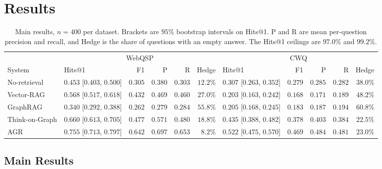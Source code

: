%
\section{Results}\label{sec:results}

\begin{table}[!t]
\caption{Main results, $n = 400$ per dataset. Brackets are $95\%$ bootstrap
  intervals on Hits@1. P and R are mean per-question precision and recall, and
  Hedge is the share of questions with an empty answer. The Hits@1 ceilings are
  $97.0\%$ and $99.2\%$.}
\label{tab:main}
\centering
\small
\setlength{\tabcolsep}{4.5pt}
\begin{tabular}{@{}llrrrrlrrrr@{}}
\toprule
& \multicolumn{5}{c}{WebQSP} & \multicolumn{5}{c}{CWQ} \\
\cmidrule(lr){2-6} \cmidrule(l){7-11}
System & Hits@1 & F1 & P & R & Hedge & Hits@1 & F1 & P & R & Hedge \\
\midrule
No-retrieval & $0.453$ [$0.403$, $0.500$] & $0.305$ & $0.380$ & $0.303$ & $12.2\%$ & $0.307$ [$0.263$, $0.352$] & $0.279$ & $0.285$ & $0.282$ & $38.0\%$ \\
Vector-RAG & $0.568$ [$0.517$, $0.618$] & $0.432$ & $0.469$ & $0.460$ & $27.0\%$ & $0.203$ [$0.163$, $0.242$] & $0.168$ & $0.171$ & $0.189$ & $48.2\%$ \\
GraphRAG & $0.340$ [$0.292$, $0.388$] & $0.262$ & $0.279$ & $0.284$ & $55.8\%$ & $0.205$ [$0.168$, $0.245$] & $0.183$ & $0.187$ & $0.194$ & $60.8\%$ \\
Think-on-Graph & $0.660$ [$0.613$, $0.705$] & $0.477$ & $0.571$ & $0.480$ & $18.8\%$ & $0.435$ [$0.388$, $0.482$] & $0.378$ & $0.403$ & $0.384$ & $\mathbf{22.5\%}$ \\
AGR & $\mathbf{0.755}$ [$0.713$, $0.797$] & $\mathbf{0.642}$ & $\mathbf{0.697}$ & $\mathbf{0.653}$ & $\mathbf{8.2\%}$ & $\mathbf{0.522}$ [$0.475$, $0.570$] & $\mathbf{0.469}$ & $\mathbf{0.484}$ & $\mathbf{0.481}$ & $23.0\%$ \\
\bottomrule
\end{tabular}
\end{table}

\subsection{Main Results}\label{sec:main}

